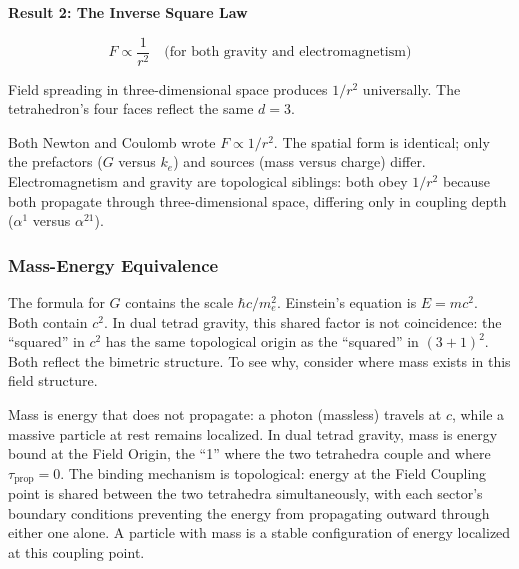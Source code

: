 \documentclass[aps,prd,preprint,superscriptaddress,showpacs,preprintnumbers,amsmath,amssymb,nofootinbib]{revtex4-2}
\begin{document}
\vspace{1.5em}
\noindent
\colorbox{resultgreen}{\parbox{\dimexpr\textwidth-2\fboxsep\relax}{%
\vspace{0.8em}
\centering
\textbf{\large Result 2: The Inverse Square Law}

\vspace{0.5em}
\boldmath
\begin{equation}
F \propto \frac{1}{r^2} \quad \text{(for both gravity and electromagnetism)}
\end{equation}
\unboldmath

\vspace{0.3em}
Field spreading in three-dimensional space produces $1/r^2$ universally. The tetrahedron's four faces reflect the same $d = 3$.
\vspace{0.5em}
}}
\vspace{1cm}

Both Newton and Coulomb wrote $F \propto 1/r^2$. The spatial form is identical; only the prefactors ($G$ versus $k_e$) and sources (mass versus charge) differ. Electromagnetism and gravity are topological siblings: both obey $1/r^2$ because both propagate through three-dimensional space, differing only in coupling depth ($\alpha^1$ versus $\alpha^{21}$).

\subsubsection*{Mass-Energy Equivalence}

The formula for $G$ contains the scale $\hbar c / m_e^2$. Einstein's equation is $E = mc^2$. Both contain $c^2$. In dual tetrad gravity, this shared factor is not coincidence: the ``squared'' in $c^2$ has the same topological origin as the ``squared'' in $(3{+}1)^2$. Both reflect the bimetric structure. To see why, consider where mass exists in this field structure.

Mass is energy that does not propagate: a photon (massless) travels at $c$, while a massive particle at rest remains localized. In dual tetrad gravity, mass is energy bound at the Field Origin, the ``1'' where the two tetrahedra couple and where $\tau_{\text{prop}} = 0$. The binding mechanism is topological: energy at the Field Coupling point is shared between the two tetrahedra simultaneously, with each sector's boundary conditions preventing the energy from propagating outward through either one alone. A particle with mass is a stable configuration of energy localized at this coupling point.
\end{document}
